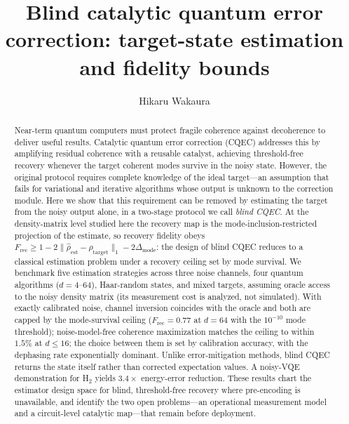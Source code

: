 \documentclass[pra,twocolumn,superscriptaddress,longbibliography,floatfix,nofootinbib]{revtex4-2}
\newcommand{\Frec}{F_\mathrm{rec}}
\newcommand{\rhot}{\rho_\mathrm{target}}
\newcommand{\rhoe}{\hat{\rho}_\mathrm{est}}
\begin{document}
\title{Blind catalytic quantum error correction: target-state estimation and fidelity bounds}

\author{Hikaru Wakaura}

\begin{abstract}
Near-term quantum computers must protect fragile coherence against decoherence to deliver useful results.
Catalytic quantum error correction (CQEC) addresses this by amplifying residual coherence with a reusable catalyst, achieving threshold-free recovery whenever the target coherent modes survive in the noisy state.
However, the original protocol requires complete knowledge of the ideal target---an assumption that fails for variational and iterative algorithms whose output is unknown to the correction module.
Here we show that this requirement can be removed by estimating the target from the noisy output alone, in a two-stage protocol we call \emph{blind CQEC}.
At the density-matrix level studied here the recovery map is the mode-inclusion-restricted projection of the estimate, so recovery fidelity obeys $\Frec \geq 1 - 2\|\rhoe - \rhot\|_1 - 2\Delta_\mathrm{mode}$: the design of blind CQEC reduces to a classical estimation problem under a recovery ceiling set by mode survival.
We benchmark five estimation strategies across three noise channels, four quantum algorithms ($d = 4$--$64$), Haar-random states, and mixed targets, assuming oracle access to the noisy density matrix (its measurement cost is analyzed, not simulated).
With exactly calibrated noise, channel inversion coincides with the oracle and both are capped by the mode-survival ceiling ($\Frec = 0.77$ at $d = 64$ with the $10^{-10}$ mode threshold); noise-model-free coherence maximization matches the ceiling to within $1.5\%$ at $d \leq 16$; the choice between them is set by calibration accuracy, with the dephasing rate exponentially dominant.
Unlike error-mitigation methods, blind CQEC returns the state itself rather than corrected expectation values.
A noisy-VQE demonstration for H$_2$ yields $3.4\times$ energy-error reduction.
These results chart the estimator design space for blind, threshold-free recovery where pre-encoding is unavailable, and identify the two open problems---an operational measurement model and a circuit-level catalytic map---that remain before deployment.
\end{abstract}

\maketitle
\end{document}
